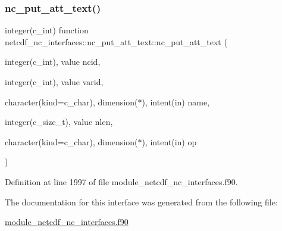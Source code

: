 \subsubsection{\texorpdfstring{nc\+\_\+put\+\_\+att\+\_\+text()}{nc\_put\_att\_text()}}
{\footnotesize\ttfamily integer(c\+\_\+int) function netcdf\+\_\+nc\+\_\+interfaces\+::nc\+\_\+put\+\_\+att\+\_\+text\+::nc\+\_\+put\+\_\+att\+\_\+text (\begin{DoxyParamCaption}\item[{integer(c\+\_\+int), value}]{ncid,  }\item[{integer(c\+\_\+int), value}]{varid,  }\item[{character(kind=c\+\_\+char), dimension($\ast$), intent(in)}]{name,  }\item[{integer(c\+\_\+size\+\_\+t), value}]{nlen,  }\item[{character(kind=c\+\_\+char), dimension($\ast$), intent(in)}]{op }\end{DoxyParamCaption})}



Definition at line 1997 of file module\+\_\+netcdf\+\_\+nc\+\_\+interfaces.\+f90.



The documentation for this interface was generated from the following file\+:\begin{DoxyCompactItemize}
\item 
\hyperlink{module__netcdf__nc__interfaces_8f90}{module\+\_\+netcdf\+\_\+nc\+\_\+interfaces.\+f90}\end{DoxyCompactItemize}
